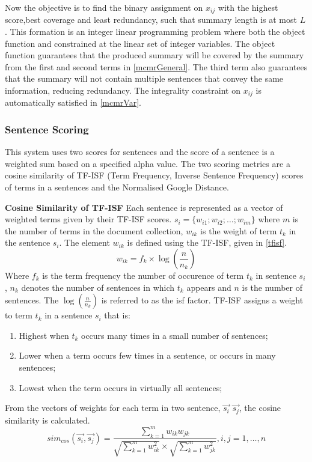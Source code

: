 Now the objective is to find the binary assignment on $x_{ij}$ with the highest score,best coverage and least redundancy, such that summary length is at most $L$. This formation is an integer linear programming problem where both the object function and constrained at the linear set of integer variables. The object function guarantees that the produced summary will be covered by the summary from the first and second terms in \ref{mcmrGeneral}. The third term also guarantees that the summary will not contain multiple sentences that convey the same information, reducing redundancy. The integrality constraint on $x_{ij}$ is automatically satisfied in \ref{mcmrVar}.

\subsubsection{Sentence Scoring}
This system uses two scores for sentences and the score of a sentence is a weighted sum based on a specified alpha value. The two scoring metrics are a cosine similarity of TF-ISF (Term Frequency, Inverse Sentence Frequency) scores of terms in a sentences and the Normalised Google Distance. 

\textbf{Cosine Similarity of TF-ISF}
Each sentence is represented as a vector of weighted terms given by their TF-ISF scores. $s_i =\{w_{i1};w_{i2}; \dots; w_{im}\}$ where $m$ is the number of terms in the document collection, $w_{ik}$ is the weight of term $t_k$ in the sentence $s_i$. The element $w_{ik}$ is defined using the TF-ISF, given in \ref{tfisf}.
\begin{equation}
    w_{ik} = f_k \times \log(\frac{n}{n_k})
    \label{tfisf}
\end{equation}
Where $f_k$ is the term frequency the number of occurence of term $t_k$ in sentence $s_i$, $n_k$ denotes the number of sentences in which $t_k$ appears and $n$ is the number of sentences. The $\log(\frac{n}{n_k})$ is referred to as the isf factor. TF-ISF assigns a weight to term $t_k$ in a sentence $s_i$ that is:
\begin{enumerate}
    \item Highest when $t_k$ occurs many times in a small number of sentences;
    \item Lower when a term occurs few times in a sentence, or occurs in many sentences;
    \item Lowest when the term occurs in virtually all sentences;
\end{enumerate}

From the vectors of weights for each term in two sentence, $\vec{s_i}$ $\vec{s_j}$, the cosine similarity is calculated.
\begin{equation}
    sim_{cos}(\vec{s_i},\vec{s_j}) = \frac{\sum_{k=1}^m w_{ik} w_{jk}}{\sqrt{\sum_{k=1}^m w_{ik}^2}\times\sqrt{\sum_{k=1}^m w_{jk}^2}}, i,j=1,\dots,n
    \label{cossimSent}
\end{equation}



